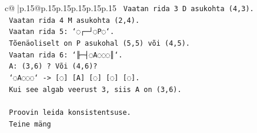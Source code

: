 \documentclass{article}
\begin{document}
{\begin{supertabular}{c@{$\;$}|p{.15\linewidth}@{}p{.15\linewidth}p{.15\linewidth}p{.15\linewidth}p{.15\linewidth}p{.15\linewidth}}
{{{\texttt{    Vaatan rida 3 D asukohta (4,3).} \\
\texttt{    Vaatan rida 4 M asukohta (2,4).} \\
\texttt{    Vaatan rida 5: `◌┌─┘◌P◌`.} \\
\texttt{    Tõenäoliselt on P asukohal (5,5) või (4,5).} \\
\texttt{    Vaatan rida 6: `╟─┤◌A◌◌◌║`.} \\
\texttt{    A: (3,6) ? Või (4,6)?} \\
\texttt{    `◌A◌◌◌` {-}> {[}◌{]} {[}A{]} {[}◌{]} {[}◌{]} {[}◌{]}.} \\
\texttt{    Kui see algab veerust 3, siis A on (3,6).} \\
\\ 
\texttt{    Proovin leida konsistentsuse.} \\
\texttt{    Teine mäng} \\
            }
        }
    }
     \\ \\


\end{supertabular}}
\end{document}
